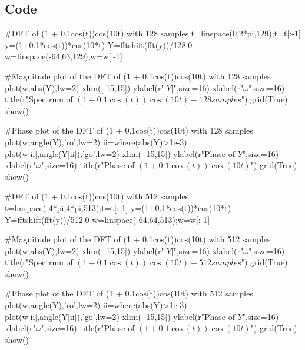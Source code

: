 \documentclass[11pt]{article}
\begin{document}
\subsection{Code}
\begin{python}
#DFT of (1 + 0.1cos(t))cos(10t) with 128 samples
t=linspace(0,2*pi,129);t=t[:-1]
y=(1+0.1*cos(t))*cos(10*t)
Y=fftshift(fft(y))/128.0
w=linspace(-64,63,129);w=w[:-1]

#Magnitude plot of the DFT of (1 + 0.1cos(t))cos(10t) with 128 samples
plot(w,abs(Y),lw=2)
xlim([-15,15])
ylabel(r"$|Y|$",size=16)
xlabel(r"$\omega$",size=16)
title(r"Spectrum of $\left(1+0.1\cos\left(t\right)\right)\cos\left(10t\right) - 128 samples$")
grid(True)
show()

#Phase plot of the DFT of (1 + 0.1cos(t))cos(10t) with 128 samples
plot(w,angle(Y),'ro',lw=2)
ii=where(abs(Y)>1e-3)
plot(w[ii],angle(Y[ii]),'go',lw=2)
xlim([-15,15])
ylabel(r"Phase of $Y$",size=16)
xlabel(r"$\omega$",size=16)
title(r"Phase of $\left(1+0.1\cos\left(t\right)\right)\cos\left(10t\right)$")
grid(True)
show()

#DFT of (1 + 0.1cos(t))cos(10t) with 512 samples
t=linspace(-4*pi,4*pi,513);t=t[:-1]
y=(1+0.1*cos(t))*cos(10*t)
Y=fftshift(fft(y))/512.0
w=linspace(-64,64,513);w=w[:-1]

#Magnitude plot of the DFT of (1 + 0.1cos(t))cos(10t) with 512 samples
plot(w,abs(Y),lw=2)
xlim([-15,15])
ylabel(r"$|Y|$",size=16)
xlabel(r"$\omega$",size=16)
title(r"Spectrum of $\left(1+0.1\cos\left(t\right)\right)\cos\left(10t\right)-512 samples$")
grid(True)
show()

#Phase plot of the DFT of (1 + 0.1cos(t))cos(10t) with 512 samples
plot(w,angle(Y),'ro',lw=2)
ii=where(abs(Y)>1e-3)
plot(w[ii],angle(Y[ii]),'go',lw=2)
xlim([-15,15])
ylabel(r"Phase of $Y$",size=16)
xlabel(r"$\omega$",size=16)
title(r"Phase of $\left(1+0.1\cos\left(t\right)\right)\cos\left(10t\right)$")
grid(True)
show()
\end{python}
\end{document}
